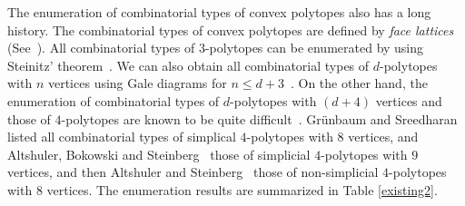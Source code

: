 \documentclass{article}
\begin{document}
The enumeration of combinatorial types of convex polytopes also has a long history.
The combinatorial types of convex polytopes are defined by {\it face lattices} (See~\cite{G72,Z95}).
All combinatorial types of $3$-polytopes can be enumerated by using Steinitz' theorem~\cite{S22,SR34}.
We can also obtain all combinatorial types of $d$-polytopes with $n$ vertices using Gale diagrams for $n \leq d+3$~\cite{L70,F06}.
On the other hand, the enumeration of combinatorial types of
$d$-polytopes with $(d+4)$ vertices and those of $4$-polytopes
are known to be quite difficult~\cite{M88,R96}.
Gr\"unbaum and Sreedharan~\cite{GS67} listed all combinatorial types of simplical $4$-polytopes with $8$ vertices, and
Altshuler, Bokowski and Steinberg~\cite{ABS80} those of simplicial $4$-polytopes with $9$ vertices, and then
Altshuler and Steinberg~\cite{AS85} those of non-simplicial $4$-polytopes with $8$ vertices.
The enumeration results are summarized in Table \ref{existing2}.
\end{document}

